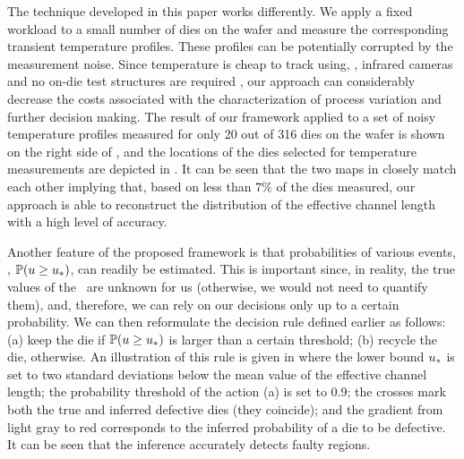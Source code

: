 The technique developed in this paper works differently. We apply a fixed workload to a small number of dies on the wafer and measure the corresponding transient temperature profiles. These profiles can be potentially corrupted by the measurement noise. Since temperature is cheap to track using, \eg, infrared cameras and no on-die test structures are required \cite{mesa-martinez2007}, our approach can considerably decrease the costs associated with the characterization of process variation and further decision making.
The result of our framework applied to a set of noisy temperature profiles measured for only 20 out of 316 dies on the wafer is shown on the right side of , and the locations of the dies selected for temperature measurements are depicted in .
It can be seen that the two maps in  closely match each other implying that, based on less than $7\%$ of the dies measured, our approach is able to reconstruct the distribution of the effective channel length with a high level of accuracy.

Another feature of the proposed framework is that probabilities of various events, \eg, $\mathbb{P}(u \geq u_*)$, can readily be estimated.
This is important since, in reality, the true values of the \qoi\ are unknown for us (otherwise, we would not need to quantify them), and, therefore, we can rely on our decisions only up to a certain probability.
We can then reformulate the decision rule defined earlier as follows: (a) keep the die if $\mathbb{P}(u \geq u_*)$ is larger than a certain threshold; (b) recycle the die, otherwise.
An illustration of this rule is given in  where the lower bound $u_*$ is set to two standard deviations below the mean value of the effective channel length; the probability threshold of the action (a) is set to 0.9; the crosses mark both the true and inferred defective dies (they coincide); and the gradient from light gray to red corresponds to the inferred probability of a die to be defective. It can be seen that the inference accurately detects faulty regions.



